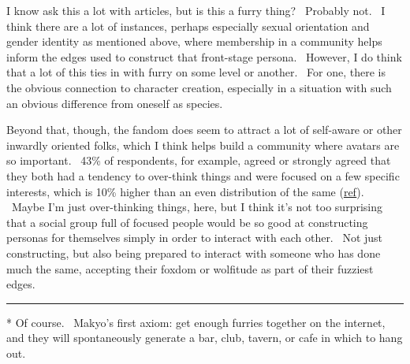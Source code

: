 I know ask this a lot with articles, but is this a furry thing?
~Probably not. ~I think there are a lot of instances, perhaps especially
sexual orientation and gender identity as mentioned above, where
membership in a community helps inform the edges used to construct that
front-stage persona. ~However, I do think that a lot of this ties in
with furry on some level or another. ~For one, there is the obvious
connection to character creation, especially in a situation with such an
obvious difference from oneself as species.

Beyond that, though, the fandom does seem to attract a lot of self-aware
or other inwardly oriented folks, which I think helps build a community
where avatars are so important. ~43\% of respondents, for example,
agreed or strongly agreed that they both had a tendency to over-think
things and were focused on a few specific interests, which is 10\%
higher than an even distribution of the same
(\href{http://adjectivespecies.com/wp-content/uploads/2013/01/overthinking-focus.png}{ref}).
~Maybe I'm just over-thinking things, here, but I think it's not too
surprising that a social group full of focused people would be so good
at constructing personas for themselves simply in order to interact with
each other. ~Not just constructing, but also being prepared to interact
with someone who has done much the same, accepting their foxdom or
wolfitude as part of their fuzziest edges.

\begin{center}\rule{0.5\linewidth}{\linethickness}\end{center}

* Of course. ~Makyo's first axiom: get enough furries together on the
internet, and they will spontaneously generate a bar, club, tavern, or
cafe in which to hang out.
